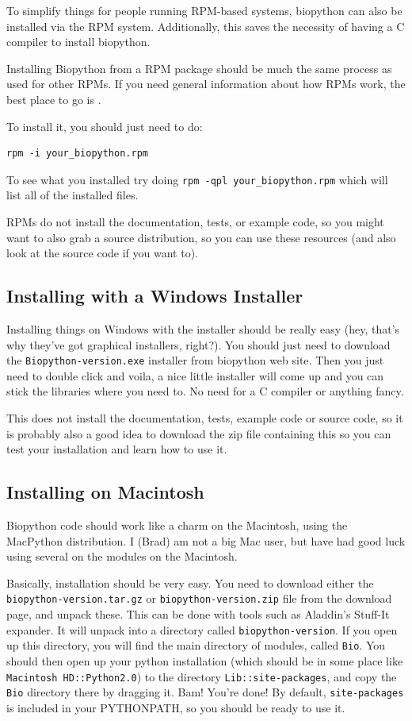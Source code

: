 \documentclass{report}
\begin{document}
To simplify things for people running RPM-based systems, biopython can
also be installed via the RPM system. Additionally, this saves the 
necessity of having a C compiler to install biopython. 


Installing Biopython from a RPM package should be much the same process as used for other RPMs. If you need general information about how RPMs work, the best place to go is .


To install it, you should just need to do:

\begin{verbatim}
rpm -i your_biopython.rpm
\end{verbatim}

To see what you installed try doing \verb|rpm -qpl your_biopython.rpm| which will list all of the installed files.


RPMs do not install the documentation, tests, or example code, so you might want to also grab a source distribution, so you can use these resources (and also look at the source code if you want to).


\subsection{Installing with a Windows Installer}

Installing things on Windows with the installer should be really easy (hey, that's why they've got graphical installers, right?). You should just need to download the \verb|Biopython-version.exe| installer from biopython web site. Then you just need to double click and voila, a nice little installer will come up and you can stick the libraries where you need to. No need for a C compiler or anything fancy.


This does not install the documentation, tests, example code or source code, so it is probably also a good idea to download the zip file containing this so you can test your installation and learn how to use it.

\subsection{Installing on Macintosh}

Biopython code should work like a charm on the Macintosh, using the MacPython distribution. I (Brad) am not a big Mac user, but have had good luck using several on the modules on the Macintosh.


Basically, installation should be very easy. You need to download either the \verb|biopython-version.tar.gz| or \verb|biopython-version.zip| file from the download page, and unpack these. This can be done with tools such as Aladdin's Stuff-It expander. It will unpack into a directory called \verb|biopython-version|. If you open up this directory, you will find the main directory of modules, called \verb|Bio|. You should then open up your python installation (which should be in some place like \verb|Macintosh HD::Python2.0|) to the directory \verb|Lib::site-packages|, and copy the \verb|Bio| directory there by dragging it. Bam! You're done! By default, \verb|site-packages| is included in your PYTHONPATH, so you should be ready to use it.
\end{document}
